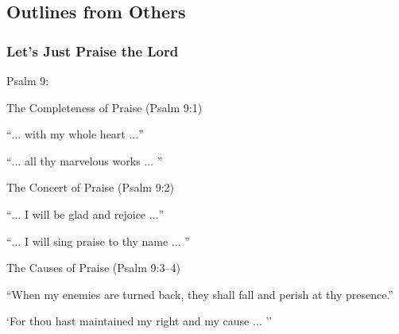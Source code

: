 \subsection{Outlines from Others}

\subsubsection{Let's Just Praise the Lord}
Psalm 9:

\begin{compactenum}[I.][3]
    \item The Completeness of Praise (Psalm 9:1)
    \begin{compactenum}[A.]
        \item ``$\hdots$ with my whole heart $\hdots$''
        \item ``$\hdots$ all thy marvelous works $\hdots$ ''
    \end{compactenum}
    \item The Concert of Praise (Psalm 9:2)
    \begin{compactenum}[A.]
        \item ``$\hdots$ I will be glad and rejoice  $\hdots$''
        \item ``$\hdots$ I will sing praise to thy name $\hdots$ ''
    \end{compactenum}
    \item The Causes of Praise (Psalm 9:3--4)
    \begin{compactenum}[A.]
        \item ``When my enemies are turned back, they shall fall and perish at thy presence.'' 
        \item `For thou hast maintained my right and my cause $\hdots$ ''
    \end{compactenum}
\end{compactenum} 

